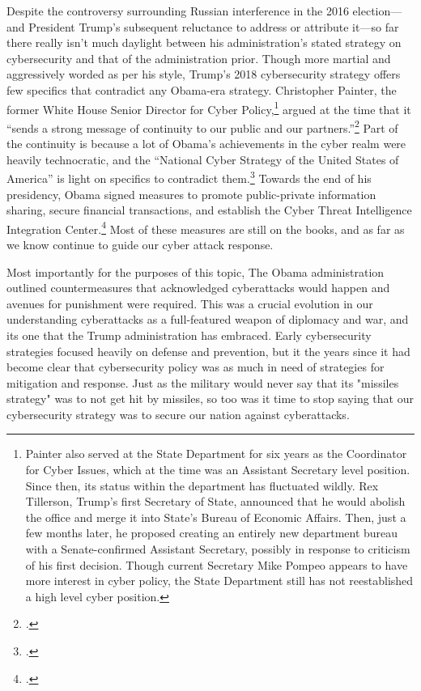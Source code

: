 \documentclass[12pt]{article}
\begin{document}
Despite the controversy surrounding Russian interference in the 2016 election---and President Trump's subsequent reluctance to address or attribute it---so far there really isn't much daylight between his administration's stated strategy on cybersecurity and that of the administration prior. Though more martial and aggressively worded as per his style, Trump's 2018 cybersecurity strategy offers few specifics that contradict any Obama-era strategy. Christopher Painter, the former White House Senior Director for Cyber Policy,\footnote{Painter also served at the State Department for six years as the Coordinator for Cyber Issues, which at the time was an Assistant Secretary level position. Since then, its status within the department has fluctuated wildly. Rex Tillerson, Trump's first Secretary of State, announced that he would abolish the office and merge it into State's Bureau of Economic Affairs. Then, just a few months later, he proposed creating an entirely new department bureau with a Senate-confirmed Assistant Secretary, possibly in response to criticism of his first decision. Though current Secretary Mike Pompeo appears to have more interest in cyber policy, the State Department still has not reestablished a high level cyber position.} argued at the time that it ``sends a strong message of continuity to our public and our partners.''\footcite{painter_white_2018} Part of the continuity is because a lot of Obama's achievements in the cyber realm were heavily technocratic, and the ``National Cyber Strategy of the United States of America'' is light on specifics to contradict them.\footcite{guest_blogger_white_2018} Towards the end of his presidency, Obama signed measures to promote public-private information sharing, secure financial transactions, and establish the Cyber Threat Intelligence Integration Center.\footcite[Among other actions taken during the Obama presidency, these were sufficenct for PolitiFact to update its 2013 rating of his promise to ``Promise Kept.'']{carroll_obama_2016} Most of these measures are still on the books, and as far as we know continue to guide our cyber attack response.

Most importantly for the purposes of this topic, The Obama administration outlined countermeasures that acknowledged cyberattacks would happen and avenues for punishment were required. This was a crucial evolution in our understanding cyberattacks as a full-featured weapon of diplomacy and war, and its one that the Trump administration has embraced. Early cybersecurity strategies focused heavily on defense and prevention, but it the years since it had become clear that cybersecurity policy was as much in need of strategies for mitigation and response. Just as the military would never say that its "missiles strategy" was to not get hit by missiles, so too was it time to stop saying that our cybersecurity strategy was to secure our nation against cyberattacks. 
\end{document}
